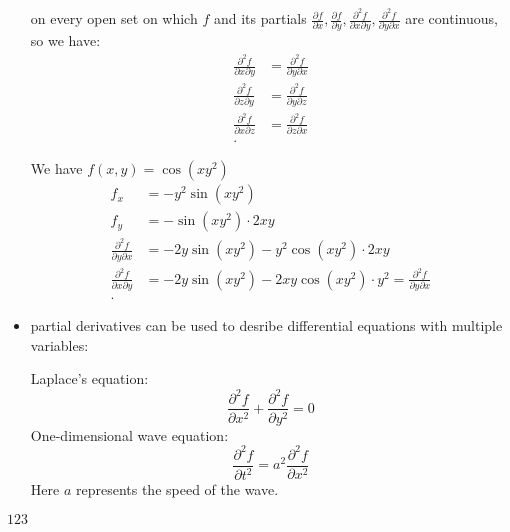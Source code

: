 \begin{itemize}
\begin{theorem}
\begin{equation}
			\end{equation}
			on every open set on which $f$ and its partials $\frac{\partial f}{\partial x}, \frac{\partial f}{\partial y}, \frac{\partial ^2f}{\partial x \partial y}, \frac{\partial ^2f}{\partial y \partial x} $ are continuous, so we have:
			\begin{align*}
				\frac{\partial ^2f}{\partial x \partial y}  &= \frac{\partial ^2f}{\partial y \partial x}  \\
				\frac{\partial ^2f}{\partial z \partial y}  &=  \frac{\partial ^2f}{\partial y \partial z}  \\
				\frac{\partial ^2f}{\partial x \partial z} &= \frac{\partial ^2f}{\partial z \partial x}  \\
			.\end{align*}
		\end{theorem}
		\begin{example}
			We have $f\left( x,y \right)  = \cos\left( xy^2 \right) $ 
			\begin{align*}
				f_{x} &= -y^2\sin\left( xy^2 \right)  \\
				f_y &= -\sin\left( xy^2 \right) \cdot 2xy \\
				\frac{\partial ^2f}{\partial y \partial x} &= -2y\sin\left( xy^2 \right)  - y^2\cos\left( xy^2 \right) \cdot 2xy \\
				\frac{\partial ^2f}{\partial x \partial y} &= -2y\sin\left( xy^2 \right) -2xy\cos\left( xy^2 \right) \cdot y^2 = \frac{\partial ^2f}{\partial y \partial x}  \\
			.\end{align*}
		\end{example}
	\item partial derivatives can be used to desribe differential equations with multiple variables:
		\begin{example}
			Laplace's equation:
			\begin{equation}
				\frac{\partial ^2f}{\partial x^2}  + \frac{\partial ^2f}{\partial y^2}=0
			\end{equation}
			One-dimensional wave equation:
			\begin{equation}
				\frac{\partial ^2f}{\partial t^2}  = a^2 \frac{\partial ^2f}{\partial x^2}
			\end{equation}
			Here $a$ represents the speed of the wave.
		\end{example}
\end{itemize}
$\mathcal{123}$
